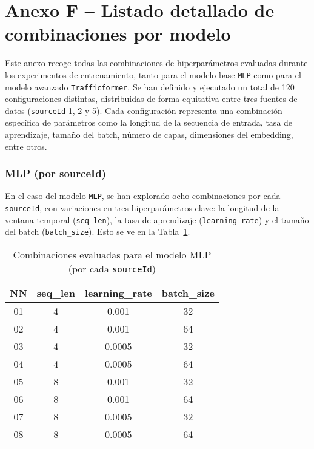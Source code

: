 \section*{Anexo F – Listado detallado de combinaciones por modelo}
\label{anexo:combinaciones_exp}

Este anexo recoge todas las combinaciones de hiperparámetros evaluadas durante los experimentos de entrenamiento, tanto para el modelo base \texttt{MLP} como para el modelo avanzado \texttt{Trafficformer}. Se han definido y ejecutado un total de 120 configuraciones distintas, distribuidas de forma equitativa entre tres fuentes de datos (\texttt{sourceId} 1, 2 y 5). Cada configuración representa una combinación específica de parámetros como la longitud de la secuencia de entrada, tasa de aprendizaje, tamaño del batch, número de capas, dimensiones del embedding, entre otros.

\subsubsection*{MLP (por sourceId)}

En el caso del modelo \texttt{MLP}, se han explorado ocho combinaciones por cada \texttt{sourceId}, con variaciones en tres hiperparámetros clave: la longitud de la ventana temporal (\texttt{seq\_len}), la tasa de aprendizaje (\texttt{learning\_rate}) y el tamaño del batch (\texttt{batch\_size}). Esto se ve en la Tabla~\ref{tab:mlp_combinaciones}.

\begin{table}[H]
	\centering
	\small
	\caption{Combinaciones evaluadas para el modelo MLP (por cada \texttt{sourceId})}
	\label{tab:mlp_combinaciones}
	\begin{tabularx}{\textwidth}{c | c | c | c}
		\toprule
		\textbf{NN} & \textbf{seq\_len} & \textbf{learning\_rate} & \textbf{batch\_size} \\
		\midrule
		01 & 4 & 0.001  & 32 \\
		02 & 4 & 0.001  & 64 \\
		03 & 4 & 0.0005 & 32 \\
		04 & 4 & 0.0005 & 64 \\
		05 & 8 & 0.001  & 32 \\
		06 & 8 & 0.001  & 64 \\
		07 & 8 & 0.0005 & 32 \\
		08 & 8 & 0.0005 & 64 \\
		\bottomrule
	\end{tabularx}
\end{table}

